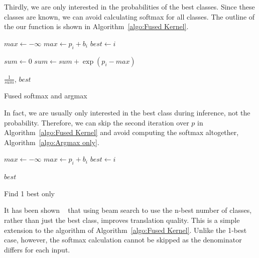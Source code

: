 \documentclass[11pt,a4paper]{article}
\begin{document}
Thirdly, we are only interested in the probabilities of the best classes. Since these classes are known, we can avoid calculating softmax for all classes. The outline of the our function is shown in Algorithm~\ref{algo:Fused Kernel}.

\begin{algorithm}
\begin{algorithmic}


\State $max \gets - \infty$ 
    \State $max \gets p_i + b_i$
    \State $best \gets i$
  \EndIf
\EndFor


\State $sum \gets 0$ 
    \State $sum \gets sum + \exp(p_i - max)$
  \EndIf
\EndFor

\Return $\frac{1}{sum}$, $best$ 

\EndProcedure
\end{algorithmic}

\caption{Fused softmax and argmax}
\label{algo:Fused Kernel}
\end{algorithm}

In fact, we are usually only interested in the best class during inference, not the probability. Therefore, we can skip the second iteration over $p$ in Algorithm~\ref{algo:Fused Kernel} and avoid computing the softmax altogether, Algorithm~\ref{algo:Argmax only}.

\begin{algorithm}
\begin{algorithmic}

\State $max \gets - \infty$ 
    \State $max \gets p_i + b_i$
    \State $best \gets i$
  \EndIf
\EndFor

\Return $best$ 

\EndProcedure

\end{algorithmic}
\caption{Find 1 best only}
\label{algo:Argmax only}
\end{algorithm}

It has been shown ~\citep{koehn-knowles:2017:NMT} that using beam search to use the n-best number of classes, rather than just the best class, improves translation quality. This is a simple extension to the algorithm of Algorithm~\ref{algo:Fused Kernel}. Unlike the 1-best case, however, the softmax calculation cannot be skipped as the denominator differs for each input.
\end{document}
